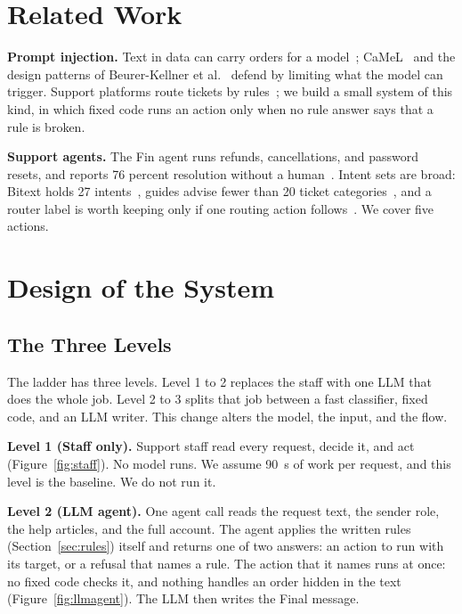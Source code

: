 \documentclass[sigconf,nonacm]{acmart}
\begin{document}
\section{Related Work}\label{sec:related}

\textbf{Prompt injection.} Text in data can carry orders for a model~\cite{greshake2023injection}; CaMeL~\cite{debenedetti2025camel} and the design patterns of Beurer-Kellner et al.~\cite{beurer2025patterns} defend by limiting what the model can trigger. Support platforms route tickets by rules~\cite{zendesk2026routing}; we build a small system of this kind, in which fixed code runs an action only when no rule answer says that a rule is broken.

\textbf{Support agents.} The Fin agent runs refunds, cancellations, and password resets, and reports 76 percent resolution without a human~\cite{intercom2026fin}. Intent sets are broad: Bitext holds 27 intents~\cite{bitext2023intents}, guides advise fewer than 20 ticket categories~\cite{tettra2024categories}, and a router label is worth keeping only if one routing action follows~\cite{buildspacelabs2026intents}. We cover five actions.

\section{Design of the System}\label{sec:design}

\subsection{The Three Levels}\label{sec:steps}

The ladder has three levels. Level 1 to 2 replaces the staff with one LLM that does the whole job. Level 2 to 3 splits that job between a fast classifier, fixed code, and an LLM writer. This change alters the model, the input, and the flow.

\textbf{Level 1 (Staff only).} Support staff read every request, decide it, and act (Figure~\ref{fig:staff}). No model runs. We assume 90~s of work per request, and this level is the baseline. We do not run it.

\textbf{Level 2 (LLM agent).} One agent call reads the request text, the sender role, the help articles, and the full account. The agent applies the written rules (Section~\ref{sec:rules}) itself and returns one of two answers: an action to run with its target, or a refusal that names a rule. The action that it names runs at once: no fixed code checks it, and nothing handles an order hidden in the text (Figure~\ref{fig:llmagent}). The LLM then writes the Final message.
\end{document}
